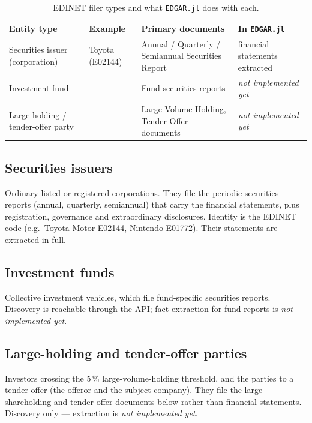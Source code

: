 \documentclass[11pt,a4paper]{report}
\begin{document}
\begin{table}[h]
\centering
\small
\caption{EDINET filer types and what \texttt{EDGAR.jl} does with each.}
\label{tab:edinet-entities}
\begin{tabular}{@{}p{}p{}p{}p{}@{}}
\toprule
\textbf{Entity type} & \textbf{Example} & \textbf{Primary documents} & \textbf{In \texttt{EDGAR.jl}} \\
\midrule
Securities issuer (corporation) & Toyota (E02144) & Annual / Quarterly / Semiannual Securities Report & financial statements extracted \\
Investment fund & --- & Fund securities reports & \emph{not implemented yet} \\
Large-holding / tender-offer party & --- & Large-Volume Holding, Tender Offer documents & \emph{not implemented yet} \\
\bottomrule
\end{tabular}
\end{table}

\subsection{Securities issuers}
Ordinary listed or registered corporations. They file the periodic securities reports (annual, quarterly,
semiannual) that carry the financial statements, plus registration, governance and extraordinary
disclosures. Identity is the EDINET code (e.g.\ Toyota Motor E02144, Nintendo E01772). Their statements are
extracted in full.

\subsection{Investment funds}
Collective investment vehicles, which file fund-specific securities reports. Discovery is reachable through
the API; fact extraction for fund reports is \emph{not implemented yet}.

\subsection{Large-holding and tender-offer parties}
Investors crossing the 5\,\% large-volume-holding threshold, and the parties to a tender offer (the offeror
and the subject company). They file the large-shareholding and tender-offer documents below rather than
financial statements. Discovery only --- extraction is \emph{not implemented yet}.
\end{document}
